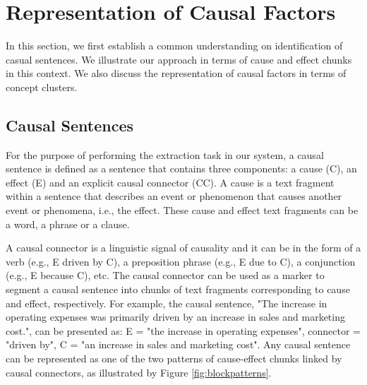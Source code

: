 \section{Representation of Causal Factors} \label{sec:causalrepresenation}

In this section, we first establish a common understanding on identification of casual sentences. We illustrate our approach in terms of cause and effect chunks in this context. We also discuss the representation of causal factors in terms of concept clusters. 

\subsection{Causal Sentences}
For the purpose of performing the extraction task in our system, a causal sentence is defined as a sentence that contains three components: a cause (C), an effect (E) and an explicit causal connector (CC). A cause is a text fragment within a sentence that describes an event or phenomenon that causes another event or phenomena, i.e., the effect. These cause and effect text fragments can be a word, a phrase or a clause. 

A causal connector is a linguistic signal of causality and it can be in the form of a verb (e.g., E driven by C), a preposition phrase (e.g., E due to C), a conjunction (e.g., E because C), etc. The causal connector can be used as a marker to segment a causal sentence into chunks of text fragments corresponding to cause and effect, respectively. For example, the causal sentence, "The increase in operating expenses was primarily driven by an increase in sales and marketing cost.", can be presented as: E = "the increase in operating expenses", connector = "driven by", C = "an increase in sales and marketing cost". Any causal sentence can be represented as one of the two patterns of cause-effect chunks linked by causal connectors, as illustrated by Figure \ref{fig:blockpatterns}.  


